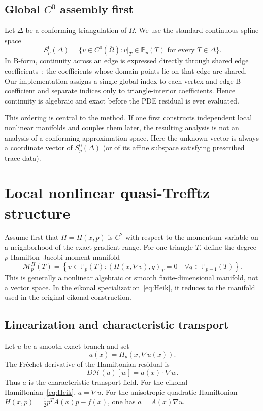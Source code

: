 \documentclass[preprint,12pt]{elsarticle}
\newcommand{\PP}{\mathbb P}
\newcommand{\grad}{\nabla}
\begin{document}
\subsection{Global $C^0$ assembly first}
Let $\Delta$ be a conforming triangulation of $\Omega$.  We use the standard continuous spline space
\[
 S_p^0(\Delta)=\{v\in C^0(\overline\Omega):v|_T\in\PP_p(T)\text{ for every }T\in\Delta\}.
\]
In B-form, continuity across an edge is expressed directly through shared edge coefficients~\cite{LaiSchumaker2007}: the coefficients whose domain points lie on that edge are shared.  Our implementation assigns a single global index to each vertex and edge B-coefficient and separate indices only to triangle-interior coefficients.  Hence continuity is algebraic and exact before the PDE residual is ever evaluated.

This ordering is central to the method.  If one first constructs independent local nonlinear manifolds and couples them later, the resulting analysis is not an analysis of a conforming approximation space.  Here the unknown vector is always a coordinate vector of $S_p^0(\Delta)$ (or of its affine subspace satisfying prescribed trace data).

\section{Local nonlinear quasi-Trefftz structure}\label{sec:local}
Assume first that $H=H(x,p)$ is $C^2$ with respect to the momentum variable on a neighborhood of the exact gradient range.  For one triangle $T$, define the degree-$p$ Hamilton--Jacobi moment manifold
\begin{equation}\label{eq:Mp}
 \mathcal M_p^H(T)=\left\{v\in\PP_p(T):(H(x,\grad v),q)_T=0\quad\forall q\in\PP_{p-1}(T)\right\}.
\end{equation}
This is generally a nonlinear algebraic or smooth finite-dimensional manifold, not a vector space.  In the eikonal specialization~\eqref{eq:Heik}, it reduces to the manifold used in the original eikonal construction.

\subsection{Linearization and characteristic transport}
Let $u$ be a smooth exact branch and set
\begin{equation}\label{eq:achar}
 a(x)=H_p(x,\grad u(x)).
\end{equation}
The Fr\'echet derivative of the Hamiltonian residual is
\begin{equation}\label{eq:linearization}
 D\mathcal H(u)[w]=a(x)\cdot\grad w.
\end{equation}
Thus $a$ is the characteristic transport field.  For the eikonal Hamiltonian~\eqref{eq:Heik}, $a=\grad u$.  For the anisotropic quadratic Hamiltonian $H(x,p)=\tfrac12p^TA(x)p-f(x)$, one has $a=A(x)\grad u$.
\end{document}
